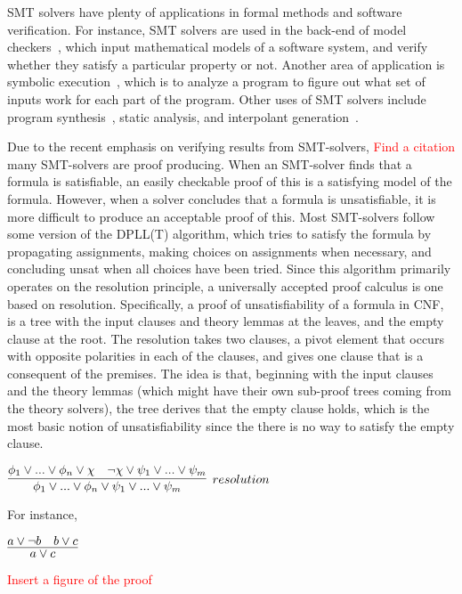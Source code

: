 \documentclass{article}
\begin{document}
	SMT solvers have plenty of applications in formal methods 
	and software verification. For instance, SMT solvers are used 
	in the back-end of model checkers~\cite{DBLP:books/daglib/0020348}, 
	which input mathematical 
	models of a software system, and verify whether they 
	satisfy a particular property or not. Another area of 
	application is symbolic
	execution~\cite{DBLP:journals/csur/BaldoniCDDF18}, 
	which is to analyze a 
	program to figure out what set of inputs work for each 
	part of the program. Other uses of SMT solvers include 
	program synthesis~\cite{synth}, static analysis, 
	and interpolant generation~\cite{DBLP:journals/corr/abs-1111-5652}.
	
	Due to the recent emphasis on verifying results from SMT-solvers,
	\textcolor{red}{Find a citation}
	many SMT-solvers are proof producing. When an SMT-solver finds 
	that a formula is satisfiable, an easily checkable proof of this is 
	a satisfying model of the formula. However, when a solver 
	concludes that a formula is unsatisfiable, it is more difficult 
	to produce an acceptable proof of this. Most SMT-solvers 
	follow some version of the DPLL(T) algorithm, which tries
	to satisfy the formula by propagating assignments, making 
	choices on assignments when necessary, and concluding unsat
	when all choices have been tried. Since this algorithm 
	primarily operates on the resolution principle, 
	a universally accepted proof calculus is one based 
	on resolution. Specifically, a proof of unsatisfiability 
	of a formula in CNF, is a tree with the input 
	clauses and theory lemmas at the leaves, and the empty 
	clause at the root. The resolution takes two clauses, 
	a pivot element that occurs with opposite polarities 
	in each of the clauses, and gives one clause that is 
	a consequent of the premises. The idea is that, beginning 
	with the input clauses and the theory lemmas (which might 
	have their own sub-proof trees coming from the theory solvers), 
	the tree derives that the empty clause holds, which is the 
	most basic notion of unsatisfiability since the there 
	is no way to satisfy the empty clause.
	
	\begin{center}
		$\infer[resolution]{\phi_1 \lor ... \lor \phi_n \lor 
			\psi_1 \lor ... \lor \psi_m}
		{\phi_1 \lor ... \lor \phi_n \lor \chi & \neg \chi 
			\lor \psi_1 \lor ... \lor \psi_m}$ 
	\end{center}
	For instance,
	\begin{center}
		$\infer{a \lor c}{a \lor \neg b & b \lor c}$
	\end{center}
	\textcolor{red}{Insert a figure of the proof}
	
\end{document}

